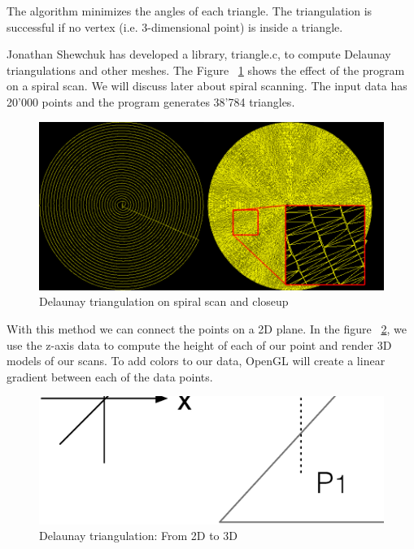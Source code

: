 The algorithm minimizes the angles of each triangle. The triangulation is successful if no vertex (i.e. 3-dimensional point) is inside a triangle.

Jonathan Shewchuk \cite{shewchuk96b} has developed a library, triangle.c, to compute Delaunay triangulations and other meshes. The Figure ~\ref{triangulation2d} shows the effect of the program on a spiral scan.  We will discuss later about spiral scanning. The input data has 20'000 points and the program generates 38'784 triangles. 

\begin{figure}[!ht]
  \centering
  \includegraphics[scale=0.45]{images/triangulation.png}
    \caption{Delaunay triangulation on spiral scan and closeup}
  \label{triangulation2d}
\end{figure}

With this method we can connect the points on a 2D plane. In the figure  ~\ref{triangulation3d}, we use the z-axis data to compute the height of each of our point and render 3D models of our scans. To add colors to our data, OpenGL will create a linear gradient between each of the data points.

\begin{figure}[H]
  \centering
  \includegraphics[scale=0.3]{images/delaunay.eps}
    \caption{Delaunay triangulation: From 2D to 3D}
  \label{triangulation3d}
\end{figure}

